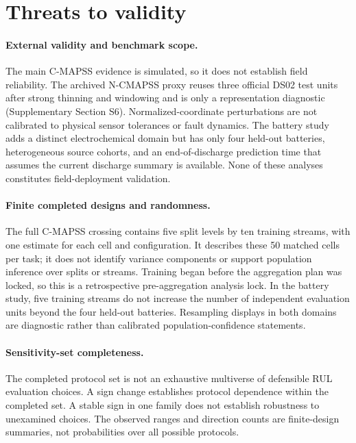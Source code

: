 \documentclass[preprint,12pt,numbers,sort&compress]{elsarticle}
\begin{document}
\section{Threats to validity}

\paragraph{External validity and benchmark scope.}
The main C-MAPSS evidence is simulated, so it does not establish field reliability. The archived N-CMAPSS proxy reuses three official DS02 test units after strong thinning and windowing and is only a representation diagnostic (Supplementary Section S6). Normalized-coordinate perturbations are not calibrated to physical sensor tolerances or fault dynamics. The battery study adds a distinct electrochemical domain but has only four held-out batteries, heterogeneous source cohorts, and an end-of-discharge prediction time that assumes the current discharge summary is available. None of these analyses constitutes field-deployment validation.

\paragraph{Finite completed designs and randomness.}
The full C-MAPSS crossing contains five split levels by ten training streams, with one estimate for each cell and configuration. It describes these 50 matched cells per task; it does not identify variance components or support population inference over splits or streams. Training began before the aggregation plan was locked, so this is a retrospective pre-aggregation analysis lock. In the battery study, five training streams do not increase the number of independent evaluation units beyond the four held-out batteries. Resampling displays in both domains are diagnostic rather than calibrated population-confidence statements.

\paragraph{Sensitivity-set completeness.}
The completed protocol set is not an exhaustive multiverse of defensible RUL evaluation choices. A sign change establishes protocol dependence within the completed set. A stable sign in one family does not establish robustness to unexamined choices. The observed ranges and direction counts are finite-design summaries, not probabilities over all possible protocols.
\end{document}
